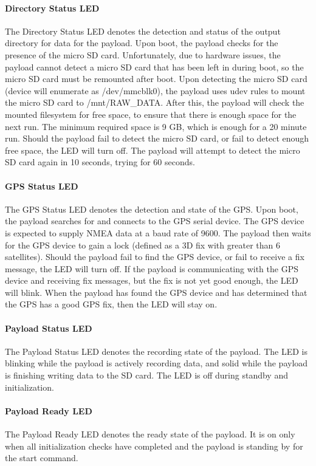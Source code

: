 \documentclass{report}
\begin{document}
								\paragraph{Directory Status LED}
									The Directory Status LED denotes the detection and status of the output directory for data for the payload.  Upon boot, the payload checks for the presence of the micro SD card.  Unfortunately, due to hardware issues, the payload cannot detect a micro SD card that has been left in during boot, so the micro SD card must be remounted after boot.  Upon detecting the micro SD card (device will enumerate as /dev/mmcblk0), the payload uses udev rules to mount the micro SD card to /mnt/RAW\_DATA.  After this, the payload will check the mounted filesystem for free space, to ensure that there is enough space for the next run.  The minimum required space is 9 GB, which is enough for a 20 minute run.  Should the payload fail to detect the micro SD card, or fail to detect enough free space, the LED will turn off.  The payload will attempt to detect the micro SD card again in 10 seconds, trying for 60 seconds.
								\paragraph{GPS Status LED}
									The GPS Status LED denotes the detection and state of the GPS.  Upon boot, the payload searches for and connects to the GPS serial device.  The GPS device is expected to supply NMEA data at a baud rate of 9600.  The payload then waits for the GPS device to gain a lock (defined as a 3D fix with greater than 6 satellites).  Should the payload fail to find the GPS device, or fail to receive a fix message, the LED will turn off.  If the payload is communicating with the GPS device and receiving fix messages, but the fix is not yet good enough, the LED will blink.  When the payload has found the GPS device and has determined that the GPS has a good GPS fix, then the LED will stay on.
								\paragraph{Payload Status LED}
									The Payload Status LED denotes the recording state of the payload.  The LED is blinking while the payload is actively recording data, and solid while the payload is finishing writing data to the SD card.  The LED is off during standby and initialization.
								\paragraph{Payload Ready LED}
									The Payload Ready LED denotes the ready state of the payload.  It is on only when all initialization checks have completed and the payload is standing by for the start command.
\end{document}
